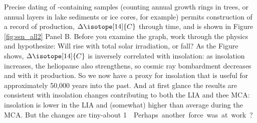 \documentclass[amstex,12pt]{book}
\begin{document}
Precise dating of -containing samples (counting annual growth rings in trees, or annual layers in lake sediments or ice cores, for example) permits construction of a record of  production, $\Delta\isotope[14]{C}$ through time, and is shown in Figure \ref{fig:ssn_all2} Panel B. Before you examine the graph, work through the physics and hypothesize: Will  rise with total solar irradiation, or fall? As the Figure shows, $\Delta\isotope[14]{C}$ is inversely correlated with insolation: as insolation increases, the heliopause also strengthens, so cosmic ray bombardment decreases and with it  production. So we now have a proxy for insolation that is useful for approximately 50,000 years into the past. And at first glance the results are consistent with insolation changes contributing to both the LIA and thee MCA: insolation is lower in the LIA and (somewhat) higher than average during the MCA. But the changes are tiny-about \SI{1}{\watt\per\metre\square}. Perhaps another force was at work? 
\end{document}
